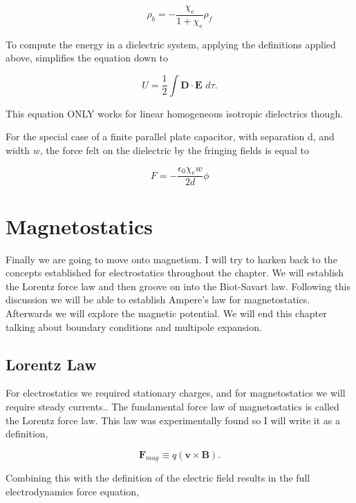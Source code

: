 \documentclass[preprint, review,12pt]{elsarticle}
\def\x{\times}
\def\.{\cdot}
\def\b{\textbf}
\def\={\equiv}
\begin{document}
\begin{equation}
    \rho_b = - \frac{\chi_e}{1+\chi_e}\rho_f
\end{equation}

To compute the energy in a dielectric system, applying the definitions applied above, simplifies the equation down to

\begin{equation}
    U = \frac{1}{2}\int \b{D}\. \b{E} \hspace{4pt} d\tau.
\end{equation}

This equation ONLY works for linear homogeneous isotropic dielectrics though.

For the special case of a finite parallel plate capacitor, with separation d, and width $w$, the force felt on the dielectric by the fringing fields is equal to 

\begin{equation}
    F = -\frac{\epsilon_0\chi_ew}{2d}\phi
\end{equation}

\section{Magnetostatics}

Finally we are going to move onto magnetism. I will try to harken back to the concepts established for electrostatics throughout the chapter. We will establish the Lorentz force law and then groove on into the Biot-Savart law. Following this discussion we will be able to establish Ampere's law for magnetostatics. Afterwards we will explore the magnetic potential. We will end this chapter talking about boundary conditions and multipole expansion.

\subsection{Lorentz Law}

For electrostatics we required stationary charges, and for magnetostatics we will require steady currents.. The fundamental force law of magnetostatics is called the Lorentz force law. This law was experimentally found so I will write it as a definition,

\begin{equation}
    \b{F}_{mag} \= q(\b{v} \x \b{B}).
\end{equation}

Combining this with the definition of the electric field results in the full electrodynamics force equation,
\end{document}
